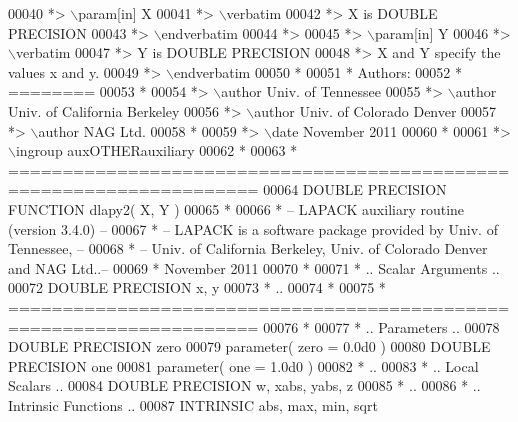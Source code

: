 \begin{DoxyCode}
00040 \textcolor{comment}{*> \(\backslash\)param[in] X}
00041 \textcolor{comment}{*> \(\backslash\)verbatim}
00042 \textcolor{comment}{*>          X is DOUBLE PRECISION}
00043 \textcolor{comment}{*> \(\backslash\)endverbatim}
00044 \textcolor{comment}{*>}
00045 \textcolor{comment}{*> \(\backslash\)param[in] Y}
00046 \textcolor{comment}{*> \(\backslash\)verbatim}
00047 \textcolor{comment}{*>          Y is DOUBLE PRECISION}
00048 \textcolor{comment}{*>          X and Y specify the values x and y.}
00049 \textcolor{comment}{*> \(\backslash\)endverbatim}
00050 \textcolor{comment}{*}
00051 \textcolor{comment}{*  Authors:}
00052 \textcolor{comment}{*  ========}
00053 \textcolor{comment}{*}
00054 \textcolor{comment}{*> \(\backslash\)author Univ. of Tennessee }
00055 \textcolor{comment}{*> \(\backslash\)author Univ. of California Berkeley }
00056 \textcolor{comment}{*> \(\backslash\)author Univ. of Colorado Denver }
00057 \textcolor{comment}{*> \(\backslash\)author NAG Ltd. }
00058 \textcolor{comment}{*}
00059 \textcolor{comment}{*> \(\backslash\)date November 2011}
00060 \textcolor{comment}{*}
00061 \textcolor{comment}{*> \(\backslash\)ingroup auxOTHERauxiliary}
00062 \textcolor{comment}{*}
00063 \textcolor{comment}{*  =====================================================================}
00064 \textcolor{keyword}{      DOUBLE PRECISION }\textcolor{keyword}{FUNCTION }dlapy2( X, Y )
00065 \textcolor{comment}{*}
00066 \textcolor{comment}{*  -- LAPACK auxiliary routine (version 3.4.0) --}
00067 \textcolor{comment}{*  -- LAPACK is a software package provided by Univ. of Tennessee,    --}
00068 \textcolor{comment}{*  -- Univ. of California Berkeley, Univ. of Colorado Denver and NAG Ltd..--}
00069 \textcolor{comment}{*     November 2011}
00070 \textcolor{comment}{*}
00071 \textcolor{comment}{*     .. Scalar Arguments ..}
00072       \textcolor{keywordtype}{DOUBLE PRECISION}   x, y
00073 \textcolor{comment}{*     ..}
00074 \textcolor{comment}{*}
00075 \textcolor{comment}{*  =====================================================================}
00076 \textcolor{comment}{*}
00077 \textcolor{comment}{*     .. Parameters ..}
00078       \textcolor{keywordtype}{DOUBLE PRECISION}   zero
00079       parameter( zero = 0.0d0 )
00080       \textcolor{keywordtype}{DOUBLE PRECISION}   one
00081       parameter( one = 1.0d0 )
00082 \textcolor{comment}{*     ..}
00083 \textcolor{comment}{*     .. Local Scalars ..}
00084       \textcolor{keywordtype}{DOUBLE PRECISION}   w, xabs, yabs, z
00085 \textcolor{comment}{*     ..}
00086 \textcolor{comment}{*     .. Intrinsic Functions ..}
00087       \textcolor{keywordtype}{INTRINSIC}          abs, max, min, sqrt

\end{DoxyCode}
